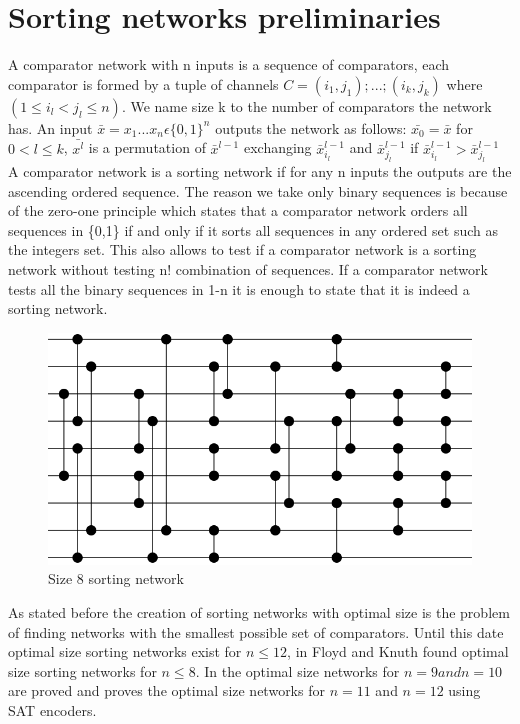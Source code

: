 \documentclass[../main.tex]{subfiles}
\begin{document}
	\section{Sorting networks preliminaries}
	A comparator network with n inputs is a sequence of comparators, each comparator is formed by a tuple of channels $C=(i_1,j_1);...;(i_k,j_k)$ where $(1 \leq i_l < j_l \leq n)$. We name size k to the number of comparators the network has. An input $\bar{x}=x_1...x_n \epsilon \{0, 1\}^n$ outputs the network as follows: $\bar{x_0}=\bar{x}$ for $0<l\leq k$, $\bar{x^l}$ is a permutation of $\bar x^{l-1}$ exchanging $\bar x^{l-1}_{i_l}$ and $\bar x^{l-1}_{j_l}$ if $\bar x^{l-1}_{i_l} > \bar x^{l-1}_{j_l}$
	A comparator network is a sorting network if for any n inputs the outputs are the ascending ordered sequence. The reason we take only binary sequences is because of the zero-one principle\cite{knuth1997art} which states that a comparator network orders all sequences in \{0,1\} if and only if it sorts all sequences in any ordered set such as the integers set. This also allows to test if a comparator network is a sorting network without testing n! combination of sequences. If a comparator network tests all the binary sequences in 1-n it is enough to state that it is indeed a sorting network.
	
	\begin{figure}[H]
		\centering
		\includegraphics[scale=0.8]{images/Size8SortingNetwork}
		\caption{Size 8 sorting network}
		\label{fig:images/Size8SortingNetwork}
	\end{figure}

	As stated before the creation of sorting networks with optimal size is the problem of finding networks with the smallest possible set of comparators. Until this date optimal size sorting networks exist for $n \leq 12$, in \cite{FLOYD1973163} Floyd and Knuth found optimal size sorting networks for $n \leq 8$. In \cite{sortingnineinputs} the optimal size networks for $n = 9 and n = 10$ are proved and \cite{harder2021answer} proves the optimal size networks for $n = 11$ and $n = 12$ using SAT encoders. 
	
	
	
\end{document}
